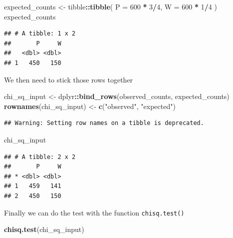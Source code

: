 \documentclass[
]{book}
\newenvironment{Shaded}{\begin{snugshade}}{\end{snugshade}}
\newcommand{\DataTypeTok}[1]{\textcolor[rgb]{0.13,0.29,0.53}{#1}}
\newcommand{\DecValTok}[1]{\textcolor[rgb]{0.00,0.00,0.81}{#1}}
\newcommand{\KeywordTok}[1]{\textcolor[rgb]{0.13,0.29,0.53}{\textbf{#1}}}
\newcommand{\NormalTok}[1]{#1}
\newcommand{\OperatorTok}[1]{\textcolor[rgb]{0.81,0.36,0.00}{\textbf{#1}}}
\newcommand{\StringTok}[1]{\textcolor[rgb]{0.31,0.60,0.02}{#1}}
\begin{document}
\begin{Shaded}
\begin{Highlighting}[]
\NormalTok{expected_counts <-}\StringTok{ }\NormalTok{tibble}\OperatorTok{::}\KeywordTok{tibble}\NormalTok{(}
   \DataTypeTok{P =} \DecValTok{600} \OperatorTok{*}\StringTok{ }\DecValTok{3}\OperatorTok{/}\DecValTok{4}\NormalTok{,}
   \DataTypeTok{W =}  \DecValTok{600} \OperatorTok{*}\StringTok{ }\DecValTok{1}\OperatorTok{/}\DecValTok{4}
\NormalTok{)}
\NormalTok{expected_counts}
\end{Highlighting}
\end{Shaded}

\begin{verbatim}
## # A tibble: 1 x 2
##       P     W
##   <dbl> <dbl>
## 1   450   150
\end{verbatim}

We then need to stick those rows together

\begin{Shaded}
\begin{Highlighting}[]
\NormalTok{chi_sq_input <-}\StringTok{ }\NormalTok{dplyr}\OperatorTok{::}\KeywordTok{bind_rows}\NormalTok{(observed_counts, expected_counts)}
\KeywordTok{rownames}\NormalTok{(chi_sq_input) <-}\StringTok{ }\KeywordTok{c}\NormalTok{(}\StringTok{"observed"}\NormalTok{, }\StringTok{"expected"}\NormalTok{)}
\end{Highlighting}
\end{Shaded}

\begin{verbatim}
## Warning: Setting row names on a tibble is deprecated.
\end{verbatim}

\begin{Shaded}
\begin{Highlighting}[]
\NormalTok{chi_sq_input}
\end{Highlighting}
\end{Shaded}

\begin{verbatim}
## # A tibble: 2 x 2
##       P     W
## * <dbl> <dbl>
## 1   459   141
## 2   450   150
\end{verbatim}

Finally we can do the test with the function \texttt{chisq.test()}

\begin{Shaded}
\begin{Highlighting}[]
\KeywordTok{chisq.test}\NormalTok{(chi_sq_input)}
\end{Highlighting}
\end{Shaded}
\end{document}
